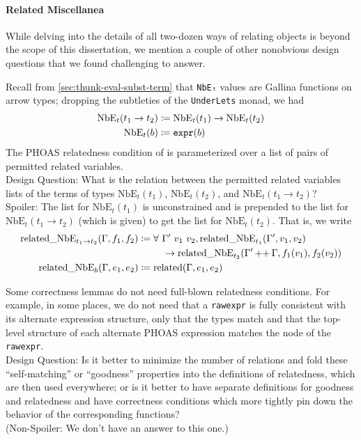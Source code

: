 \paragraph{Related Miscellanea}
While delving into the details of all two-dozen ways of relating objects is beyond the scope of this dissertation, we mention a couple of other nonobvious design questions that we found challenging to answer.

Recall from \autoref{sec:thunk-eval-subst-term} that \texttt{NbEₜ} values are Gallina functions on arrow types; dropping the subtleties of the \texttt{UnderLets} monad, we had
\begin{align*}
  \text{NbE}_t(t_1 \to t_2) & \coloneqq \text{NbE}_t(t_1) \to \text{NbE}_t(t_2) \\
  \text{NbE}_t(b) & \coloneqq \texttt{expr}(b)
\end{align*}
The PHOAS relatedness condition of  is parameterized over a list of pairs of permitted related variables. \\
Design Question: What is the relation between the permitted related variables lists of the terms of types $\text{NbE}_t(t_1)$, $\text{NbE}_t(t_2)$, and $\text{NbE}_t(t_1 \to t_2)$? \\
Spoiler: The list for $\text{NbE}_t(t_1)$ is unconstrained and is prepended to the list for $\text{NbE}_t(t_1 \to t_2)$ (which is given) to get the list for $\text{NbE}_t(t_2)$.
That is, we write
\begin{align*}
  \text{related\_NbE}_{t_1 \to t_2}(\Gamma, f_1, f_2) & \defeq \forall\ \Gamma'\ v_1\ v_2, \text{related\_NbE}_{t_1}(\Gamma', v_1, v_2) \\
  & \phantom{\defeq\forall~~}\to \text{related\_NbE}_{t_2}(\Gamma' \mathop{++} \Gamma, f_1(v_1), f_2(v_2)) \\
  \text{related\_NbE}_b(\Gamma, e_1, e_2) & \defeq \text{related}(\Gamma, e_1, e_2)
\end{align*}

Some correctness lemmas do not need full-blown relatedness conditions.
For example, in some places, we do not need that a \texttt{rawexpr} is fully consistent with its alternate expression structure, only that the types match and that the top-level structure of each alternate PHOAS expression matches the node of the \texttt{rawexpr}. \\
Design Question: Is it better to minimize the number of relations and fold these ``self-matching'' or ``goodness'' properties into the definitions of relatedness, which are then used everywhere; or is it better to have separate definitions for goodness and relatedness and have correctness conditions which more tightly pin down the behavior of the corresponding functions? \\
(Non-Spoiler: We don't have an answer to this one.)

